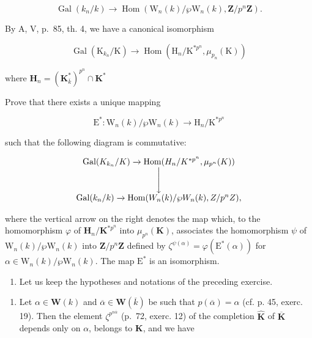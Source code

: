 \[
\operatorname{Gal} (k _ {n} / k) \to \operatorname{Hom} (\mathrm{W} _ {n} (k) / \wp \mathrm{W} _ {n} (k), \mathbf {Z} / p ^ {n} \mathbf {Z}).
\]

By A, V, p.~85, th. 4, we have a canonical isomorphism

\[
\operatorname{Gal} \left(\mathrm{K} _ {k _ {n}} / \mathrm{K}\right)\rightarrow \operatorname{Hom} \left(\mathrm{H} _ {n} / \mathrm{K} ^ {* p ^ {n}}, \mu_ {p _ {n}} (\mathrm{K})\right)
\]

\(\text{where }\mathbf{H}_n = (\mathbf{K}_{\overline{k}}^*)^{p^n}\cap \mathbf{K}^*\)

Prove that there exists a unique mapping

\[
\mathrm{E} ^ {*}: \mathrm{W} _ {n} (k) / \wp \mathrm{W} _ {n} (k) \rightarrow \mathrm{H} _ {n} / \mathrm{K} ^ {* p ^ {n}}
\]

such that the following diagram is commutative:

\[
\begin{array}{c} \operatorname{Gal} (K _ {k _ {n}} / K) \xrightarrow {} \operatorname{Hom} (H _ {n} / K ^ {* p ^ {n}}, \mu_ {p ^ {n}} (K)) \\ \Bigg \downarrow \\ \operatorname{Gal} (k _ {n} / k) \xrightarrow {} \operatorname{Hom} (W _ {n} (k) / \wp W _ {n} (k), Z / p ^ {n} Z), \end{array}
\]

where the vertical arrow on the right denotes the map which, to the homomorphism \(\varphi\) of \(\mathbf{H}_n / \mathbf{K}^{*p^n}\) into \(\mu_{p^n}(\mathbf{K})\), associates the homomorphism \(\psi\) of \(\mathrm{W}_n(k) / \wp\mathrm{W}_n(k)\) into \(\mathbf{Z} / p^n\mathbf{Z}\) defined by \(\zeta^{\psi (\alpha)} = \varphi (\mathrm{E}^{*}(\alpha))\) for \(\alpha \in \mathrm{W}_n(k) / \wp\mathrm{W}_n(k)\). The map \(\mathrm{E}^*\) is an isomorphism.

\begin{enumerate}
\def\labelenumi{\arabic{enumi})}
\setcounter{enumi}{14}
\tightlist
\item
  Let us keep the hypotheses and notations of the preceding exercise.
\end{enumerate}

\begin{enumerate}
\def\labelenumi{\alph{enumi})}
\tightlist
\item
  Let \(\alpha \in \mathbf{W}(k)\) and \(\overline{\alpha} \in \mathbf{W}(\overline{k})\) be such that \(p(\overline{\alpha}) = \alpha\) (cf. p. 45, exerc. 19). Then the element \(\zeta^{p^{n\overline{\alpha}}}\) (p.~72, exerc. 12) of the completion \(\widehat{\mathbf{K}}\) of \(\overline{\mathbf{K}}\) depends only on \(\alpha\), belongs to \(\mathbf{K}\), and we have
\end{enumerate}

